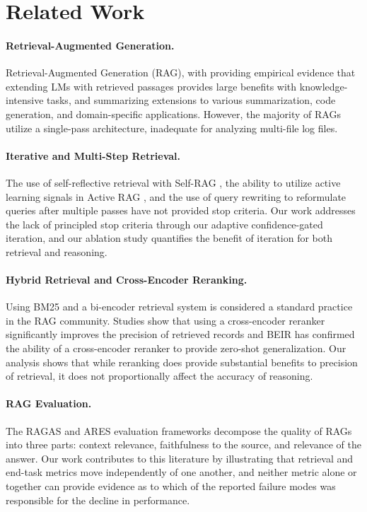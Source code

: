 \documentclass[11pt,a4paper]{article}
\begin{document}
\section{Related Work}
\label{sec:related}

\paragraph{Retrieval-Augmented Generation.}
Retrieval-Augmented Generation (RAG), with \citet{lewis2020rag}
providing empirical evidence that extending LMs with retrieved
passages provides large benefits with knowledge-intensive tasks, and
\citet{gao2023ragsurvey} summarizing extensions to various
summarization, code generation, and domain-specific applications.
However, the majority of RAGs utilize a single-pass architecture,
inadequate for analyzing multi-file log files.

\paragraph{Iterative and Multi-Step Retrieval.}
The use of self-reflective retrieval with Self-RAG
\citep{asai2024selfrag}, the ability to utilize active learning
signals in Active RAG \citep{jiang2023activerar}, and the use of
query rewriting to reformulate queries after multiple passes
\citep{wang2023queryrewrite} have not provided stop criteria.
Our work addresses the lack of principled stop criteria through our
adaptive confidence-gated iteration, and our ablation study
quantifies the benefit of iteration for both retrieval and reasoning.

\paragraph{Hybrid Retrieval and Cross-Encoder Reranking.}
Using BM25 \citep{robertson2009bm25} and a bi-encoder retrieval
system \citep{reimers2019sentencebert} is considered a standard
practice in the RAG community.
Studies show that using a cross-encoder reranker
\citep{nogueira2019passage} significantly improves the precision of
retrieved records and BEIR \citep{thakur2021beir} has confirmed the
ability of a cross-encoder reranker to provide zero-shot
generalization.
Our analysis shows that while reranking does provide substantial
benefits to precision of retrieval, it does not proportionally affect
the accuracy of reasoning.

\paragraph{RAG Evaluation.}
The RAGAS \citep{es2024ragas} and ARES \citep{saad2024ares}
evaluation frameworks decompose the quality of RAGs into three parts:
context relevance, faithfulness to the source, and relevance of the
answer.
Our work contributes to this literature by illustrating that
retrieval and end-task metrics move independently of one another, and
neither metric alone or together can provide evidence as to which of
the reported failure modes was responsible for the decline in
performance.
\end{document}
